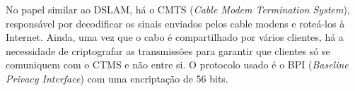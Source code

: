 \documentclass[brazil,times,12pt]{abnt}
\begin{document}
No papel similar ao DSLAM, há o CMTS (\emph{Cable Modem Termination System}),
responsável por decodificar os sinais enviados pelos cable modens e roteá-los à
Internet. Ainda, uma vez que o cabo é compartilhado por vários clientes, há a
necessidade de criptografar as transmissões para garantir que clientes só se comuniquem com o
CTMS e não entre si. O protocolo usado é o BPI (\emph{Baseline Privacy
Interface}) com uma encriptação de 56 bits.





\end{document}
